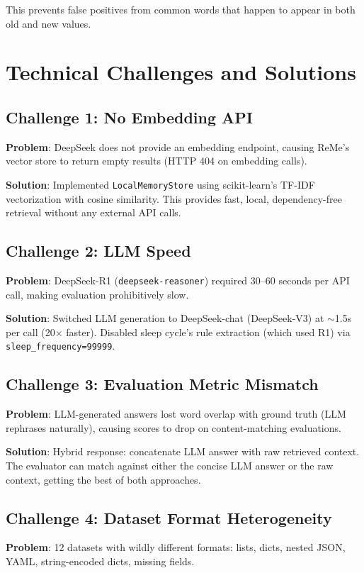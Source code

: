 \documentclass[11pt,a4paper]{article}
\begin{document}
This prevents false positives from common words that happen to appear in both old and new values.

\section{Technical Challenges and Solutions}

\subsection{Challenge 1: No Embedding API}
\textbf{Problem}: DeepSeek does not provide an embedding endpoint, causing ReMe's vector store to return empty results (HTTP 404 on embedding calls).

\textbf{Solution}: Implemented \texttt{LocalMemoryStore} using scikit-learn's TF-IDF vectorization with cosine similarity. This provides fast, local, dependency-free retrieval without any external API calls.

\subsection{Challenge 2: LLM Speed}
\textbf{Problem}: DeepSeek-R1 (\texttt{deepseek-reasoner}) required 30--60 seconds per API call, making evaluation prohibitively slow.

\textbf{Solution}: Switched LLM generation to DeepSeek-chat (DeepSeek-V3) at $\sim$1.5s per call (20$\times$ faster). Disabled sleep cycle's rule extraction (which used R1) via \texttt{sleep\_frequency=99999}.

\subsection{Challenge 3: Evaluation Metric Mismatch}
\textbf{Problem}: LLM-generated answers lost word overlap with ground truth (LLM rephrases naturally), causing scores to drop on content-matching evaluations.

\textbf{Solution}: Hybrid response: concatenate LLM answer with raw retrieved context. The evaluator can match against either the concise LLM answer or the raw context, getting the best of both approaches.

\subsection{Challenge 4: Dataset Format Heterogeneity}
\textbf{Problem}: 12 datasets with wildly different formats: lists, dicts, nested JSON, YAML, string-encoded dicts, missing fields.
\end{document}
